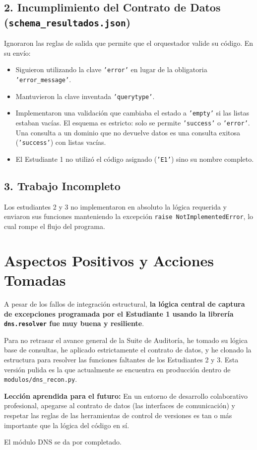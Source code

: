 \documentclass[12pt,a4paper]{article}
\begin{document}
\subsection*{2. Incumplimiento del Contrato de Datos (\texttt{schema\_resultados.json})}
Ignoraron las reglas de salida que permite que el orquestador valide su código. En su envío:
\begin{itemize}[label=$\bullet$]
    \item Siguieron utilizando la clave \texttt{'error'} en lugar de la obligatoria \texttt{'error\_message'}.
    \item Mantuvieron la clave inventada \texttt{'querytype'}.
    \item Implementaron una validación que cambiaba el estado a \texttt{'empty'} si las listas estaban vacías. El esquema es estricto: solo se permite \texttt{'success'} o \texttt{'error'}. Una consulta a un dominio que no devuelve datos es una consulta exitosa (\texttt{'success'}) con listas vacías.
    \item El Estudiante 1 no utilizó el código asignado (\texttt{'E1'}) sino su nombre completo.
\end{itemize}

\subsection*{3. Trabajo Incompleto}
Los estudiantes 2 y 3 no implementaron en absoluto la lógica requerida y enviaron sus funciones manteniendo la excepción \texttt{raise NotImplementedError}, lo cual rompe el flujo del programa.

\section*{Aspectos Positivos y Acciones Tomadas}

A pesar de los fallos de integración estructural, \textbf{la lógica central de captura de excepciones programada por el Estudiante 1 usando la librería \texttt{dns.resolver} fue muy buena y resiliente}. 

Para no retrasar el avance general de la Suite de Auditoría, he tomado su lógica base de consultas, he aplicado estrictamente el contrato de datos, y he clonado la estructura para resolver las funciones faltantes de los Estudiantes 2 y 3. Esta versión pulida es la que actualmente se encuentra en producción dentro de \texttt{modulos/dns\_recon.py}.

\vspace{1cm}
\noindent \textbf{Lección aprendida para el futuro:} En un entorno de desarrollo colaborativo profesional, apegarse al contrato de datos (las interfaces de comunicación) y respetar las reglas de las herramientas de control de versiones es tan o más importante que la lógica del código en sí.

\vspace{0.5cm}
\noindent El módulo DNS se da por completado.
\end{document}
